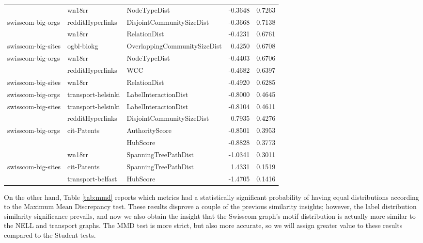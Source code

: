 \begin{table}[H]
\begin{adjustbox}{width=0.85\columnwidth}
\begin{tabular}{lllrr}
                   & wn18rr & NodeTypeDist & -0.3648 &       0.7263 \\
swisscom-big-orgs & redditHyperlinks & DisjointCommunitySizeDist & -0.3668 &       0.7138 \\
                   & wn18rr & RelationDist & -0.4231 &       0.6761 \\
swisscom-big-sites & ogbl-biokg & OverlappingCommunitySizeDist &  0.4250 &       0.6708 \\
swisscom-big-orgs & wn18rr & NodeTypeDist & -0.4403 &       0.6706 \\
                   & redditHyperlinks & WCC & -0.4682 &       0.6397 \\
swisscom-big-sites & wn18rr & RelationDist & -0.4920 &       0.6285 \\
swisscom-big-orgs & transport-helsinki & LabelInteractionDist & -0.8000 &       0.4645 \\
swisscom-big-sites & transport-helsinki & LabelInteractionDist & -0.8104 &       0.4611 \\
                   & redditHyperlinks & DisjointCommunitySizeDist &  0.7935 &       0.4276 \\
swisscom-big-orgs & cit-Patents & AuthorityScore & -0.8501 &       0.3953 \\
                   &                   & HubScore & -0.8828 &       0.3773 \\
                   & wn18rr & SpanningTreePathDist & -1.0341 &       0.3011 \\
swisscom-big-sites & cit-Patents & SpanningTreePathDist &  1.4331 &       0.1519 \\
                   & transport-belfast & HubScore & -1.4705 &       0.1416 \\
\bottomrule
\end{tabular}
\end{adjustbox}
\end{table}

On the other hand, Table \ref{tab:mmd} reports which metrics had a statistically significant probability of having equal distributions according to the Maximum Mean Discrepancy test. These results disprove a couple of the previous similarity insights; however, the label distribution similarity significance prevails, and now we also obtain the insight that the Swisscom graph's motif distribution is actually more similar to the NELL and transport graphs. The MMD test is more strict, but also more accurate, so we will assign greater value to these results compared to the Student tests.


